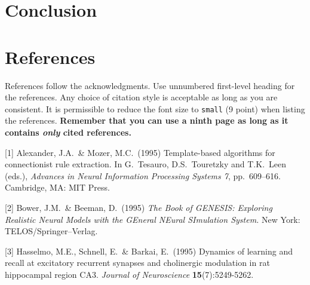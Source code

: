 \documentclass{article}
\begin{document}
% 


\section{Conclusion}



\section*{References}

References follow the acknowledgments. Use unnumbered first-level
heading for the references. Any choice of citation style is acceptable
as long as you are consistent. It is permissible to reduce the font
size to \verb+small+ (9 point) when listing the references. {\bf
  Remember that you can use a ninth page as long as it contains
  \emph{only} cited references.}
\medskip

\small

[1] Alexander, J.A.\ \& Mozer, M.C.\ (1995) Template-based algorithms
for connectionist rule extraction. In G.\ Tesauro, D.S.\ Touretzky and
T.K.\ Leen (eds.), {\it Advances in Neural Information Processing
  Systems 7}, pp.\ 609--616. Cambridge, MA: MIT Press.

[2] Bower, J.M.\ \& Beeman, D.\ (1995) {\it The Book of GENESIS:
  Exploring Realistic Neural Models with the GEneral NEural SImulation
  System.}  New York: TELOS/Springer--Verlag.

[3] Hasselmo, M.E., Schnell, E.\ \& Barkai, E.\ (1995) Dynamics of
learning and recall at excitatory recurrent synapses and cholinergic
modulation in rat hippocampal region CA3. {\it Journal of
  Neuroscience} {\bf 15}(7):5249-5262.
\end{document}
